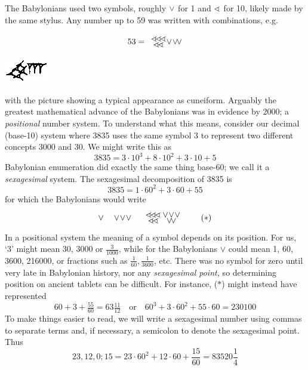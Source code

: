 The Babylonians used two symbols, roughly $\vee$ for 1 and $\sphericalangle$ for 10, likely made by the same stylus. Any number up to 59 was written with combinations, e.g.\par
\begin{minipage}[t]{0.8\linewidth}\vspace{-10pt}
\[53=\begin{array}{c}
\bten\!\bten\!\bten\\[-5pt]
\bten\!\bten
\end{array}\hspace{-7pt}\bone\!\bone\!\bone
\]
\end{minipage}\hfill\begin{minipage}[t]{0.19\linewidth}\vspace{0pt}
\flushright\includegraphics{babylon53}
\end{minipage}\medbreak
with the picture showing a typical appearance as cuneiform. Arguably the greatest mathematical advance of the Babylonians was in evidence by 2000\BC{}; a \emph{positional} number system. To understand what this means, consider our decimal (base-10) system where 3835 uses the same symbol 3 to represent two different concepts 3000 and 30. We might write this as
\[3835=3\cdot 10^3+8\cdot 10^2+3\cdot 10+5\]
Babylonian enumeration did exactly the same thing base-60; we call it a \emph{sexagesimal} system. The sexagesimal decomposition of 3835 is
\[3835=1\cdot 60^2+3\cdot 60+55\]
for which the Babylonians would write
\[\vee\quad \vee\!\vee\!\vee\quad \begin{array}{c}
\bten\!\bten\!\bten\\[-5pt]
\bten\!\bten
\end{array}\hspace{-8pt}\begin{array}{c}
\bone\!\bone\!\bone\\[-5pt]
\bone\!\bone
\end{array}
\tag{$\ast$}\]
In a positional system the meaning of a symbol depends on its position. For us, `3' might mean 30, 3000 or $\frac 3{1000}$, while for the Babylonians $\vee$ could mean 1, 60, 3600, 216000, or fractions such as $\frac 1{60},\frac 1{3600}$, etc. There was no symbol for zero until very late in Babylonian history, nor any \emph{sexagesimal point,} so determining position on ancient tablets can be difficult. For instance, ($\ast$) might instead have represented
\[60+3+\tfrac{55}{60}=63\tfrac{11}{12}\quad\text{or}\quad 60^3+3\cdot 60^2+55\cdot 60=230100\]
To make things easier to read, we will write a sexagesimal number using commas to separate terms and, if necessary, a semicolon to denote the sexagesimal point. Thus
\[23,12,0;15=23\cdot 60^2+12\cdot 60+\frac{15}{60}=83520\frac 14\] 

